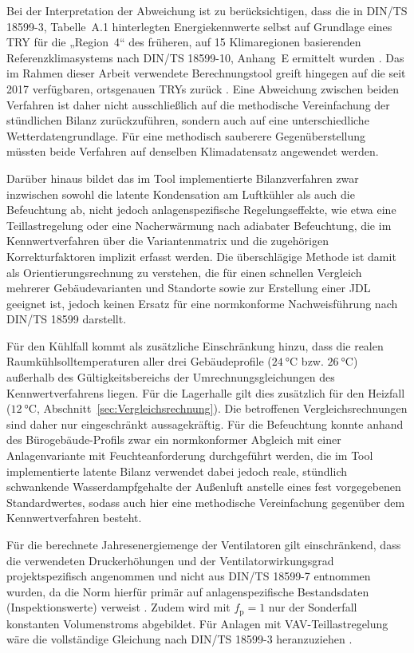 \documentclass{scrreprt}
\begin{document}
Bei der Interpretation der Abweichung ist zu berücksichtigen, dass
die in DIN/TS 18599-3, Tabelle~A.1 hinterlegten Energiekennwerte
selbst auf Grundlage eines \ac{TRY} für die
„Region~4“ des früheren, auf 15 Klimaregionen basierenden
Referenzklimasystems nach DIN/TS 18599-10, Anhang~E ermittelt wurden
\parencite{DIN185993,DIN1859910}. Das im Rahmen dieser Arbeit
verwendete Berechnungstool greift hingegen auf die seit 2017
verfügbaren, ortsgenauen \acp{TRY} zurück
\parencite{DWDBBR2017,Spekat2011}. Eine Abweichung zwischen beiden
Verfahren ist daher nicht ausschließlich auf die methodische
Vereinfachung der stündlichen Bilanz zurückzuführen, sondern auch auf
eine unterschiedliche Wetterdatengrundlage. Für eine methodisch
sauberere Gegenüberstellung müssten beide Verfahren auf denselben
Klimadatensatz angewendet werden.

Darüber hinaus bildet das im Tool implementierte Bilanzverfahren
zwar inzwischen sowohl die latente Kondensation am Luftkühler als auch die Befeuchtung ab, nicht jedoch
anlagenspezifische Regelungseffekte, wie etwa eine Teillastregelung
oder eine Nacherwärmung nach adiabater Befeuchtung, die im
Kennwertverfahren über die Variantenmatrix und die zugehörigen
Korrekturfaktoren implizit erfasst werden. Die überschlägige Methode
ist damit als Orientierungsrechnung zu verstehen, die für einen
schnellen Vergleich mehrerer Gebäudevarianten und Standorte sowie zur
Erstellung einer \ac{JDL} geeignet ist, jedoch keinen Ersatz für eine
normkonforme Nachweisführung nach DIN/TS 18599 darstellt.

Für den Kühlfall kommt als zusätzliche Einschränkung hinzu, dass die
realen Raumkühlsolltemperaturen aller drei Gebäudeprofile
($\SI{24}{\celsius}$ bzw. $\SI{26}{\celsius}$) außerhalb des
Gültigkeitsbereichs der Umrechnungsgleichungen des Kennwertverfahrens
liegen. Für die Lagerhalle gilt dies zusätzlich für den Heizfall
($\SI{12}{\celsius}$, Abschnitt~\ref{sec:Vergleichsrechnung}). Die
betroffenen Vergleichsrechnungen sind daher nur eingeschränkt
aussagekräftig. Für die Befeuchtung konnte anhand des
Bürogebäude-Profils zwar ein normkonformer Abgleich mit einer
Anlagenvariante mit Feuchteanforderung durchgeführt werden, die im
Tool implementierte latente Bilanz verwendet dabei jedoch
reale, stündlich schwankende Wasserdampfgehalte der Außenluft
anstelle eines fest vorgegebenen Standardwertes, sodass auch hier
eine methodische Vereinfachung gegenüber dem Kennwertverfahren
besteht.

Für die berechnete Jahresenergiemenge der Ventilatoren gilt
einschränkend, dass die verwendeten Druckerhöhungen und der
Ventilatorwirkungsgrad projektspezifisch angenommen und nicht aus
DIN/TS 18599-7 entnommen wurden, da die Norm hierfür primär auf
anlagenspezifische Bestandsdaten (Inspektionswerte) verweist
\parencite{DIN185997}. Zudem wird mit $f_{\mathrm{p}}=1$ nur der
Sonderfall konstanten Volumenstroms abgebildet. Für Anlagen mit
\ac{VAV}-Teillastregelung wäre die vollständige Gleichung nach
DIN/TS 18599-3 heranzuziehen \parencite{DIN185993}.
\end{document}
